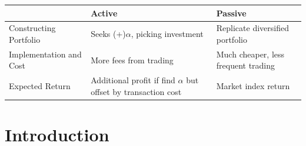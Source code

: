 \documentclass[]{book}
\theoremstyle{definition}
\theoremstyle{definition}
\theoremstyle{remark}
\begin{document}
\begin{longtable}[]{@{}lll@{}}
\toprule
\begin{minipage}[b]{0.30\columnwidth}\raggedright\strut
\strut
\end{minipage} & \begin{minipage}[b]{0.30\columnwidth}\raggedright\strut
Active\strut
\end{minipage} & \begin{minipage}[b]{0.30\columnwidth}\raggedright\strut
Passive\strut
\end{minipage}\tabularnewline
\midrule
\endhead
\begin{minipage}[t]{0.30\columnwidth}\raggedright\strut
Constructing Portfolio\strut
\end{minipage} & \begin{minipage}[t]{0.30\columnwidth}\raggedright\strut
Seeks (+)\(\alpha\), picking investment\strut
\end{minipage} & \begin{minipage}[t]{0.30\columnwidth}\raggedright\strut
Replicate diversified portfolio\strut
\end{minipage}\tabularnewline
\begin{minipage}[t]{0.30\columnwidth}\raggedright\strut
Implementation and Cost\strut
\end{minipage} & \begin{minipage}[t]{0.30\columnwidth}\raggedright\strut
More fees from trading\strut
\end{minipage} & \begin{minipage}[t]{0.30\columnwidth}\raggedright\strut
Much cheaper, less frequent trading\strut
\end{minipage}\tabularnewline
\begin{minipage}[t]{0.30\columnwidth}\raggedright\strut
Expected Return\strut
\end{minipage} & \begin{minipage}[t]{0.30\columnwidth}\raggedright\strut
Additional profit if find \(\alpha\) but offset by transaction
cost\strut
\end{minipage} & \begin{minipage}[t]{0.30\columnwidth}\raggedright\strut
Market index return\strut
\end{minipage}\tabularnewline
\bottomrule
\end{longtable}

\section{Introduction}\label{introduction}
\end{document}
